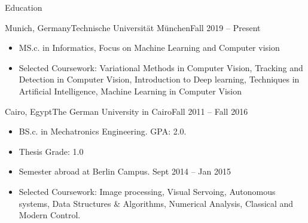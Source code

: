 \documentclass[]{mcdowellcv}
\begin{document}
	\makeheader
	
	\begin{cvsection}{Education}
		\begin{cvsubsection}{Munich, Germany}{Technische Universität München}{Fall 2019 -- Present}
			\begin{itemize}
				\item MS.c. in Informatics, Focus on Machine Learning and Computer vision
				\item Selected Coursework: Variational Methods in Computer Vision, Tracking and Detection in Computer Vision, Introduction to Deep learning, Techniques in Artificial Intelligence, Machine Learning in Computer Vision
			\end{itemize}
		\end{cvsubsection}
		\begin{cvsubsection}{Cairo, Egypt}{The German University in Cairo}{Fall 2011 -- Fall 2016}
			\begin{itemize}
				\item BS.c. in Mechatronics Engineering. GPA: 2.0.
				\item Thesis Grade: 1.0
				\item Semester abroad at Berlin Campus. Sept 2014 -- Jan 2015
				\item Selected Coursework: Image processing, Visual Servoing, Autonomous systems, Data Structures \& Algorithms, Numerical Analysis, Classical and Modern Control.
			\end{itemize}
		\end{cvsubsection}
	\end{cvsection}
	
\end{document}
